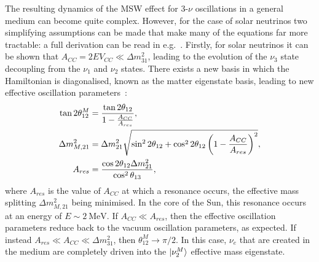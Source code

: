 The resulting dynamics of the MSW effect for 3-$\nu$ oscillations in a general medium can become quite complex. However, for the case of solar neutrinos two simplifying assumptions can be made that make many of the equations far more tractable: a full derivation can be read in e.g.~\cite{}. %
Firstly, for solar neutrinos it can be shown that $A_{CC} = 2EV_{CC} \ll \Delta m^{2}_{31}$, leading to the evolution of the $\nu_{3}$ state decoupling from the $\nu_{1}$ and $\nu_{2}$ states. There exists a new basis in which the Hamiltonian is diagonalised, known as the matter eigenstate basis, leading to new effective oscillation parameters~\cite{}: %
\begin{align}\label{eq:matter_osc_params}
    \tan{2\theta_{12}^{M}} &= \frac{\tan{2\theta_{12}}}{1-\frac{A_{CC}}{A_{res}}},\nonumber\\
    \Delta m^{2}_{M,21} &= \Delta m^{2}_{21}{}\sqrt{\sin^{2}2\theta_{12} + \cos^{2}2\theta_{12}\left(1-\frac{A_{CC}}{A_{res}}\right)^{2}},\\
    A_{res} &= \frac{\cos{2\theta_{12}\ensuremath{\Delta m^{2}_{21}}{}}}{\cos^{2}\theta_{13}},\nonumber
\end{align}
where $A_{res}$ is the value of $A_{CC}$ at which a resonance occurs, the effective mass splitting $\Delta m^{2}_{M,21}$ being minimised. In the core of the Sun, this resonance occurs at an energy of $E\sim \SI{2}{\MeV}$. If $A_{CC} \ll A_{res}$, then the effective oscillation parameters reduce back to the vacuum oscillation parameters, as expected. If instead $A_{res} \ll A_{CC} \ll \Delta m^{2}_{31}$, then $\theta_{12}^{M}\to \pi/2$. In this case, $\nu_{e}$ that are created in the medium are completely driven into the $\ket{\nu_{2}^{M}}$ effective mass eigenstate.

